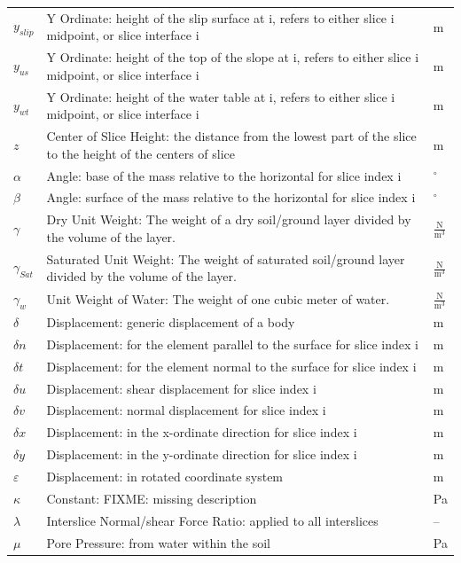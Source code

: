 \documentclass[12pt]{article}
\begin{document}
\begin{longtabu}{l X[l] l}
\\
${y_{slip}}$ & Y Ordinate: height of the slip surface at i, refers to either slice i midpoint, or slice interface i & m
\\
${y_{us}}$ & Y Ordinate: height of the top of the slope at i, refers to either slice i midpoint, or slice interface i & m
\\
${y_{wt}}$ & Y Ordinate: height of the water table at i, refers to either slice i midpoint, or slice interface i & m
\\
$z$ & Center of Slice Height: the distance from the lowest part of the slice to the height of the centers of slice & m
\\
$α$ & Angle: base of the mass relative to the horizontal for slice index i & ${}^{\circ}$
\\
$β$ & Angle: surface of the mass relative to the horizontal for slice index i & ${}^{\circ}$
\\
$γ$ & Dry Unit Weight: The weight of a dry soil/ground layer divided by the volume of the layer. & $\frac{\text{N}}{\text{m}^{3}}$
\\
${γ_{Sat}}$ & Saturated Unit Weight: The weight of saturated soil/ground layer divided by the volume of the layer. & $\frac{\text{N}}{\text{m}^{3}}$
\\
${γ_{w}}$ & Unit Weight of Water: The weight of one cubic meter of water. & $\frac{\text{N}}{\text{m}^{3}}$
\\
$δ$ & Displacement: generic displacement of a body & m
\\
$δn$ & Displacement: for the element parallel to the surface for slice index i & m
\\
$δt$ & Displacement: for the element normal to the surface for slice index i & m
\\
$δu$ & Displacement: shear displacement for slice index i & m
\\
$δv$ & Displacement: normal displacement for slice index i & m
\\
$δx$ & Displacement: in the x-ordinate direction for slice index i & m
\\
$δy$ & Displacement: in the y-ordinate direction for slice index i & m
\\
$ε$ & Displacement: in rotated coordinate system & m
\\
$κ$ & Constant: FIXME: missing description & Pa
\\
$λ$ & Interslice Normal/shear Force Ratio: applied to all interslices & --
\\
$μ$ & Pore Pressure: from water within the soil & Pa

\end{longtabu}
\end{document}
